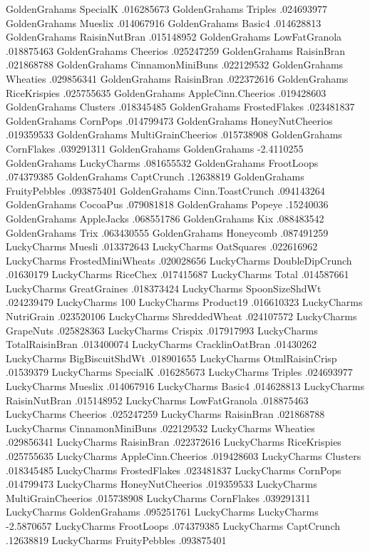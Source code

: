 GoldenGrahams	SpecialK	.016285673
GoldenGrahams	Triples	.024693977
GoldenGrahams	Mueslix	.014067916
GoldenGrahams	Basic4	.014628813
GoldenGrahams	RaisinNutBran	.015148952
GoldenGrahams	LowFatGranola	.018875463
GoldenGrahams	Cheerios	.025247259
GoldenGrahams	RaisinBran	.021868788
GoldenGrahams	CinnamonMiniBuns	.022129532
GoldenGrahams	Wheaties	.029856341
GoldenGrahams	RaisinBran	.022372616
GoldenGrahams	RiceKrispies	.025755635
GoldenGrahams	AppleCinn.Cheerios	.019428603
GoldenGrahams	Clusters	.018345485
GoldenGrahams	FrostedFlakes	.023481837
GoldenGrahams	CornPops	.014799473
GoldenGrahams	HoneyNutCheerios	.019359533
GoldenGrahams	MultiGrainCheerios	.015738908
GoldenGrahams	CornFlakes	.039291311
GoldenGrahams	GoldenGrahams	-2.4110255
GoldenGrahams	LuckyCharms	.081655532
GoldenGrahams	FrootLoops	.074379385
GoldenGrahams	CaptCrunch	.12638819
GoldenGrahams	FruityPebbles	.093875401
GoldenGrahams	Cinn.ToastCrunch	.094143264
GoldenGrahams	CocoaPus	.079081818
GoldenGrahams	Popeye	.15240036
GoldenGrahams	AppleJacks	.068551786
GoldenGrahams	Kix	.088483542
GoldenGrahams	Trix	.063430555
GoldenGrahams	Honeycomb	.087491259
LuckyCharms	Muesli	.013372643
LuckyCharms	OatSquares	.022616962
LuckyCharms	FrostedMiniWheats	.020028656
LuckyCharms	DoubleDipCrunch	.01630179
LuckyCharms	RiceChex	.017415687
LuckyCharms	Total	.014587661
LuckyCharms	GreatGraines	.018373424
LuckyCharms	SpoonSizeShdWt	.024239479
LuckyCharms	100%
LuckyCharms	Product19	.016610323
LuckyCharms	NutriGrain	.023520106
LuckyCharms	ShreddedWheat	.024107572
LuckyCharms	GrapeNuts	.025828363
LuckyCharms	Crispix	.017917993
LuckyCharms	TotalRaisinBran	.013400074
LuckyCharms	CracklinOatBran	.01430262
LuckyCharms	BigBiscuitShdWt	.018901655
LuckyCharms	OtmlRaisinCrisp	.01539379
LuckyCharms	SpecialK	.016285673
LuckyCharms	Triples	.024693977
LuckyCharms	Mueslix	.014067916
LuckyCharms	Basic4	.014628813
LuckyCharms	RaisinNutBran	.015148952
LuckyCharms	LowFatGranola	.018875463
LuckyCharms	Cheerios	.025247259
LuckyCharms	RaisinBran	.021868788
LuckyCharms	CinnamonMiniBuns	.022129532
LuckyCharms	Wheaties	.029856341
LuckyCharms	RaisinBran	.022372616
LuckyCharms	RiceKrispies	.025755635
LuckyCharms	AppleCinn.Cheerios	.019428603
LuckyCharms	Clusters	.018345485
LuckyCharms	FrostedFlakes	.023481837
LuckyCharms	CornPops	.014799473
LuckyCharms	HoneyNutCheerios	.019359533
LuckyCharms	MultiGrainCheerios	.015738908
LuckyCharms	CornFlakes	.039291311
LuckyCharms	GoldenGrahams	.095251761
LuckyCharms	LuckyCharms	-2.5870657
LuckyCharms	FrootLoops	.074379385
LuckyCharms	CaptCrunch	.12638819
LuckyCharms	FruityPebbles	.093875401
